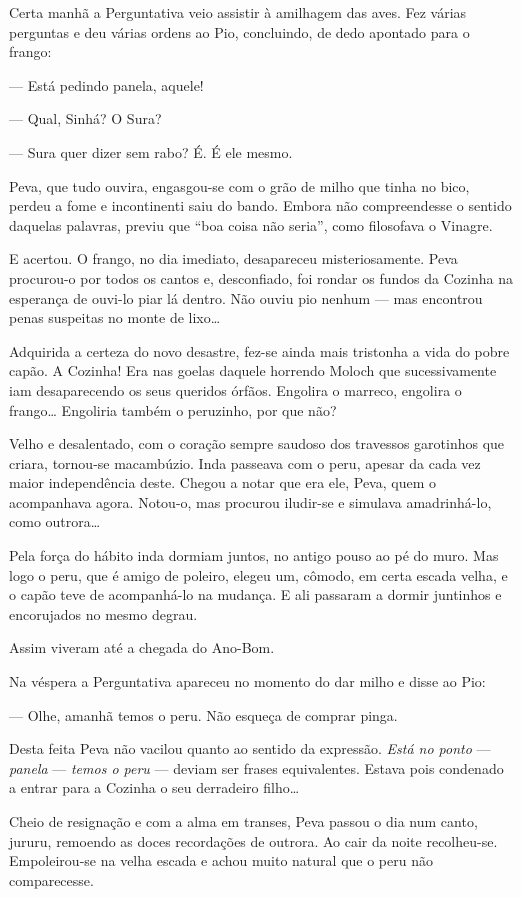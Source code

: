 Certa manhã a Perguntativa veio assistir à amilhagem das aves. Fez
várias perguntas e deu várias ordens ao Pio, concluindo, de dedo
apontado para o frango:

--- Está pedindo panela, aquele!

--- Qual, Sinhá? O Sura?

--- Sura quer dizer sem rabo? É. É ele mesmo.

Peva, que tudo ouvira, engasgou-se com o grão de milho que tinha no
bico, perdeu a fome e incontinenti saiu do bando. Embora não
compreendesse o sentido daquelas palavras, previu que ``boa coisa não
seria'', como filosofava o Vinagre.

E acertou. O frango, no dia imediato, desapareceu misteriosamente. Peva
procurou-o por todos os cantos e, desconfiado, foi rondar os fundos da
Cozinha na esperança de ouvi-lo piar lá dentro. Não ouviu pio nenhum ---
mas encontrou penas suspeitas no monte de lixo\ldots{}

Adquirida a certeza do novo desastre, fez-se ainda mais tristonha a vida
do pobre capão. A Cozinha! Era nas goelas daquele horrendo Moloch que
sucessivamente iam desaparecendo os seus queridos órfãos. Engolira o
marreco, engolira o frango\ldots{} Engoliria também o peruzinho, por que não?

Velho e desalentado, com o coração sempre saudoso dos travessos
garotinhos que criara, tornou-se macambúzio. Inda passeava com o peru,
apesar da cada vez maior independência deste. Chegou a notar que era
ele, Peva, quem o acompanhava agora. Notou-o, mas procurou iludir-se e
simulava amadrinhá-lo, como outrora\ldots{}

Pela força do hábito inda dormiam juntos, no antigo pouso ao pé do muro.
Mas logo o peru, que é amigo de poleiro, elegeu um, cômodo, em certa
escada velha, e o capão teve de acompanhá-lo na mudança. E ali passaram
a dormir juntinhos e encorujados no mesmo degrau.

Assim viveram até a chegada do Ano-Bom.

Na véspera a Perguntativa apareceu no momento do dar milho e disse ao
Pio:

--- Olhe, amanhã temos o peru. Não esqueça de comprar pinga.

Desta feita Peva não vacilou quanto ao sentido da expressão. \emph{Está
no ponto} --- \emph{panela} --- \emph{temos o peru} --- deviam ser
frases equivalentes. Estava pois condenado a entrar para a Cozinha o seu
derradeiro filho\ldots{}

Cheio de resignação e com a alma em transes, Peva passou o dia num
canto, jururu, remoendo as doces recordações de outrora. Ao cair da
noite recolheu-se. Empoleirou-se na velha escada e achou muito natural
que o peru não comparecesse.


